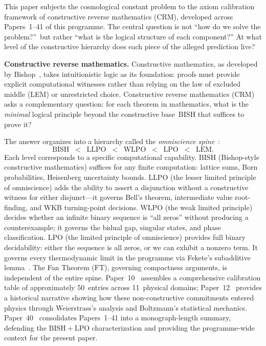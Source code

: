 \documentclass[11pt,a4paper]{article}
\theoremstyle{plain}
\theoremstyle{definition}
\newcommand{\LPO}{\ensuremath{\mathrm{LPO}}}
\newcommand{\WLPO}{\ensuremath{\mathrm{WLPO}}}
\newcommand{\BISH}{\ensuremath{\mathrm{BISH}}}
\begin{document}
This paper subjects the cosmological constant problem to the axiom
calibration framework of constructive reverse mathematics (CRM),
developed across Papers~1--41 of this programme.  The central question
is not ``how do we solve the problem?''\ but rather ``what is the
logical structure of each component?''  At what level of the
constructive hierarchy does each piece of the alleged prediction live?

\medskip\noindent
\textbf{Constructive reverse mathematics.}\quad
Constructive mathematics, as developed by
Bishop~\cite{Bishop1967,BridgesVita2006,BridgesRichman1987},
takes intuitionistic logic as its foundation: proofs must provide
explicit computational witnesses rather than relying on the law of
excluded middle (LEM) or unrestricted choice.  Constructive reverse
mathematics (CRM)~\cite{Ishihara2006} asks a complementary question:
for each theorem in mathematics, what is the \emph{minimal} logical
principle beyond the constructive base~$\BISH$ that suffices to
prove it?

The answer organizes into a hierarchy called the
\emph{omniscience spine}~\cite{BrattkaEtAl2012}:
\[
  \BISH \;\;<\;\; \mathrm{LLPO} \;\;<\;\; \WLPO \;\;<\;\; \LPO
    \;\;<\;\; \mathrm{LEM}.
\]
Each level corresponds to a specific computational capability.
$\BISH$ (Bishop-style constructive mathematics) suffices for any
finite computation: lattice sums, Born probabilities, Heisenberg
uncertainty bounds.
$\mathrm{LLPO}$ (the lesser limited principle of omniscience) adds
the ability to assert a disjunction without a constructive witness
for either disjunct---it governs Bell's theorem, intermediate value
root-finding, and WKB turning-point decisions.
$\WLPO$ (the weak limited principle) decides whether an infinite
binary sequence is ``all zeros'' without producing a counterexample;
it governs the bidual gap, singular states, and phase classification.
$\LPO$ (the limited principle of omniscience) provides full binary
decidability: either the sequence is all zeros, or we can exhibit
a nonzero term.  It governs every thermodynamic limit in the programme
via Fekete's subadditive lemma~\cite{Fekete1923,Lee26P29}.
The Fan Theorem ($\mathrm{FT}$), governing compactness arguments,
is independent of the entire spine.
Paper~10~\cite{Lee26P10} assembles a comprehensive calibration
table of approximately 50~entries across 11~physical domains;
Paper~12~\cite{Lee26P12} provides a historical narrative showing how
these non-constructive commitments entered physics through
Weierstrass's analysis and Boltzmann's statistical mechanics.
Paper~40~\cite{Lee26P40} consolidates Papers~1--41 into a
monograph-length summary, defending the $\BISH + \LPO$
characterization and providing the programme-wide context for the
present paper.
\end{document}
